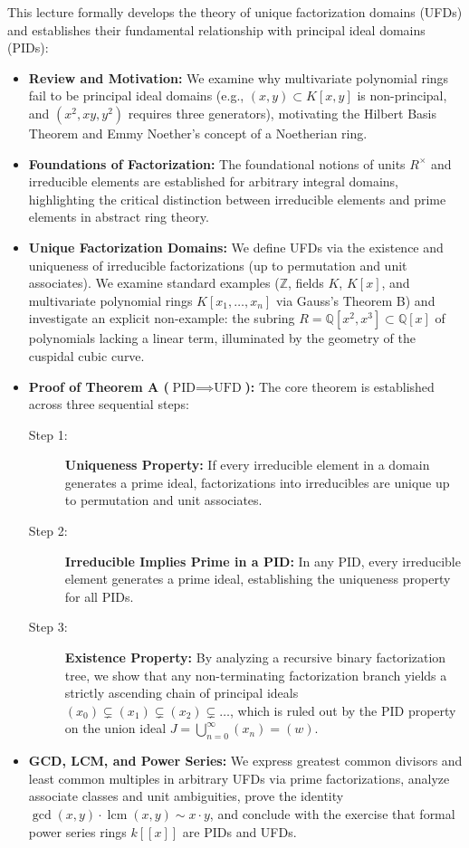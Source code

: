 \begin{overview}
This lecture formally develops the theory of unique factorization domains (UFDs) and establishes their fundamental relationship with principal ideal domains (PIDs):
\begin{itemize}
    \item \textbf{Review and Motivation:} We examine why multivariate polynomial rings fail to be principal ideal domains (e.g., $(x, y) \subset K[x, y]$ is non-principal, and $(x^2, xy, y^2)$ requires three generators), motivating the Hilbert Basis Theorem and Emmy Noether's concept of a Noetherian ring.
    \item \textbf{Foundations of Factorization:} The foundational notions of units $R^\times$ and irreducible elements are established for arbitrary integral domains, highlighting the critical distinction between irreducible elements and prime elements in abstract ring theory.
    \item \textbf{Unique Factorization Domains:} We define UFDs via the existence and uniqueness of irreducible factorizations (up to permutation and unit associates). We examine standard examples ($\mathbb{Z}$, fields $K$, $K[x]$, and multivariate polynomial rings $K[x_1, \dots, x_n]$ via Gauss's Theorem B) and investigate an explicit non-example: the subring $R = \mathbb{Q}[x^2, x^3] \subset \mathbb{Q}[x]$ of polynomials lacking a linear term, illuminated by the geometry of the cuspidal cubic curve.
    \item \textbf{Proof of Theorem A ($\text{PID} \implies \text{UFD}$):} The core theorem is established across three sequential steps:
    \begin{description}
        \item[Step 1:] \textbf{Uniqueness Property:} If every irreducible element in a domain generates a prime ideal, factorizations into irreducibles are unique up to permutation and unit associates.
        \item[Step 2:] \textbf{Irreducible Implies Prime in a PID:} In any PID, every irreducible element generates a prime ideal, establishing the uniqueness property for all PIDs.
        \item[Step 3:] \textbf{Existence Property:} By analyzing a recursive binary factorization tree, we show that any non-terminating factorization branch yields a strictly ascending chain of principal ideals $(x_0) \subsetneq (x_1) \subsetneq (x_2) \subsetneq \dots$, which is ruled out by the PID property on the union ideal $J = \bigcup_{n=0}^\infty (x_n) = (w)$.
    \end{description}
    \item \textbf{GCD, LCM, and Power Series:} We express greatest common divisors and least common multiples in arbitrary UFDs via prime factorizations, analyze associate classes and unit ambiguities, prove the identity $\operatorname{gcd}(x, y) \cdot \operatorname{lcm}(x, y) \sim x \cdot y$, and conclude with the exercise that formal power series rings $k[[x]]$ are PIDs and UFDs.
\end{itemize}
\end{overview}

